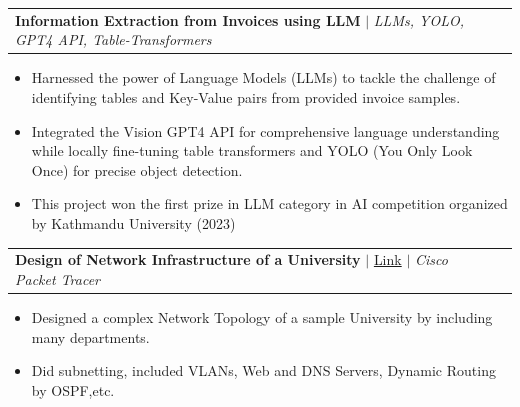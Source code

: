 \documentclass[letterpaper,11pt]{article}
\makeatletter
\newcommand{\resumeItem}[1]{
  \item\small{
    {#1 \vspace{-2pt}}
  }
}
\newcommand{\resumeProjectHeading}[2]{
    \item
    \begin{tabular*}{0.97\textwidth}{l@{\extracolsep{\fill}}r}
      \small#1 & #2 \\
    \end{tabular*}\vspace{-7pt}
}
\newcommand{\resumeItemListStart}{\begin{itemize}}
\newcommand{\resumeItemListEnd}{\end{itemize}\vspace{-5pt}}
\makeatother
\begin{document}
        \resumeProjectHeading
          {\textbf {Information Extraction from Invoices using LLM} $|$ \emph{LLMs, YOLO, GPT4 API, Table-Transformers}}{}
          \resumeItemListStart
            \resumeItem{ Harnessed the power of Language Models (LLMs) to tackle the challenge of identifying tables and Key-Value pairs from provided invoice samples. }
            \resumeItem{ Integrated the Vision GPT4 API for comprehensive language understanding while locally fine-tuning table transformers and YOLO (You Only Look Once) for precise object detection. }
            \resumeItem{ This project won the first prize in LLM category in AI competition organized by Kathmandu University (2023) }
          \resumeItemListEnd
        
        \resumeProjectHeading
          {\textbf{Design of Network Infrastructure of a University} $|$ \href{https://github.com/avisekksarma/Computer-Network-Project} {Link} $|$ \emph{Cisco Packet Tracer}}{}
          \resumeItemListStart
            \resumeItem{Designed a complex Network Topology of a sample University by including many departments.}
            \resumeItem{Did subnetting, included VLANs, Web and DNS Servers, Dynamic Routing by OSPF,etc.}
          \resumeItemListEnd
        
\end{document}
